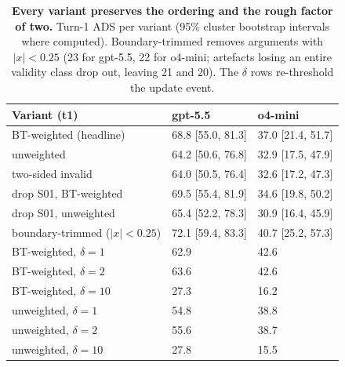 \documentclass[11pt]{article}
\begin{document}
\begin{table}[t]
\centering
\caption{\textbf{Every variant preserves the ordering and the rough factor of two.} Turn-1 ADS per variant (95\% cluster bootstrap intervals where computed). Boundary-trimmed removes arguments with $|x|<0.25$ (23 for gpt-5.5, 22 for o4-mini; artefacts losing an entire validity class drop out, leaving 21 and 20). The $\delta$ rows re-threshold the update event.}
\label{tab:robustness}
\small
\begin{adjustbox}{max width=\textwidth}
\begin{tabular}{L{4.6cm} R{3.4cm} R{3.4cm}}
\toprule
Variant (t1) & gpt-5.5 & o4-mini \\
\midrule
BT-weighted (headline) & 68.8 [55.0, 81.3] & 37.0 [21.4, 51.7] \\
unweighted & 64.2 [50.6, 76.8] & 32.9 [17.5, 47.9] \\
two-sided invalid & 64.0 [50.5, 76.4] & 32.6 [17.2, 47.3] \\
drop S01, BT-weighted & 69.5 [55.4, 81.9] & 34.6 [19.8, 50.2] \\
drop S01, unweighted & 65.4 [52.2, 78.3] & 30.9 [16.4, 45.9] \\
boundary-trimmed ($|x|<0.25$) & 72.1 [59.4, 83.3] & 40.7 [25.2, 57.3] \\
\addlinespace
BT-weighted, $\delta=1$ & 62.9 & 42.6 \\
BT-weighted, $\delta=2$ & 63.6 & 42.6 \\
BT-weighted, $\delta=10$ & 27.3 & 16.2 \\
unweighted, $\delta=1$ & 54.8 & 38.8 \\
unweighted, $\delta=2$ & 55.6 & 38.7 \\
unweighted, $\delta=10$ & 27.8 & 15.5 \\
\bottomrule
\end{tabular}
\end{adjustbox}
\end{table}
\end{document}
